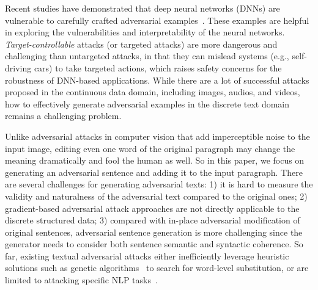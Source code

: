 Recent studies have demonstrated that deep neural networks (DNNs) are vulnerable to carefully crafted adversarial examples~\citep{Goodfellow2015ExplainingAH,Papernot2016DistillationAA,Eykholt2017RobustPA,MoosaviDezfooli2016DeepFoolAS}. 
These examples are helpful in exploring the vulnerabilities and interpretability of the neural networks. \textit{Target-controllable} attacks (or targeted attacks) are more dangerous and challenging than untargeted attacks, in that they can mislead systems (e.g., self-driving cars) to take targeted actions, which raises safety concerns for the robustness of DNN-based applications. 
While there are a lot of successful attacks proposed in the continuous data domain, including images, audios, and videos, how to effectively generate adversarial examples in the discrete text domain remains a challenging problem. 

Unlike adversarial attacks in computer vision that add imperceptible noise to the input image, editing even one word of the original paragraph may change the meaning dramatically and fool the human as well. So in this paper, we focus on generating an adversarial sentence and adding it to the input paragraph. There are several challenges for generating adversarial texts: 
1) it is hard to measure the validity and naturalness of the adversarial text compared to the original ones;  %
2) gradient-based adversarial attack approaches are not directly applicable to the discrete structured data; %
3) compared with in-place adversarial modification of original sentences, adversarial sentence generation is more challenging since the generator needs to consider both sentence semantic and syntactic coherence.
So far, existing textual adversarial attacks either inefficiently leverage heuristic solutions such as genetic algorithms~\citep{TextFooler} to search for word-level substitution, or are limited to attacking specific NLP tasks~\citep{jia-liang-2017-adversarial,2018arXiv181200151L}. 


